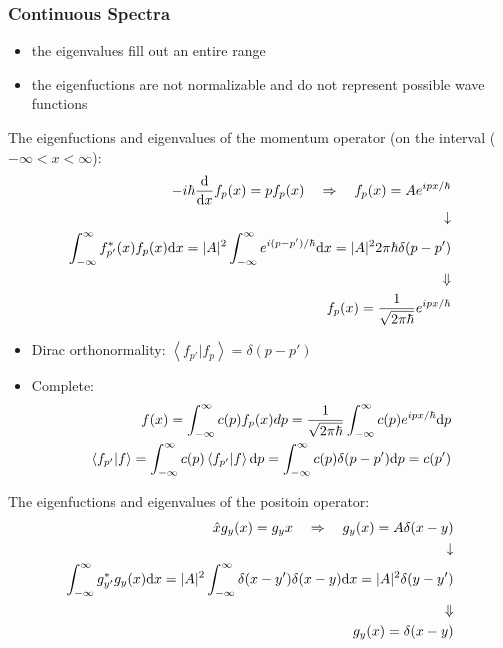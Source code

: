 \documentclass[a4paper,12pt]{article}
\begin{document}
\subsubsection{Continuous Spectra}
\begin{itemize}
       \item the eigenvalues fill out an entire range
       \item the eigenfuctions are not normalizable and do not represent possible wave functions
\end{itemize}
The eigenfuctions and eigenvalues of the momentum operator (on the interval (\(-\infty < x < \infty\)):
\[ \begin{split}
       -i\hbar \dv{x}f_p(x) = pf_p(x) \quad\Rightarrow\quad 
   f_p(x) = Ae^{ipx/\hbar} \\ \downarrow \\
   \int_{-\infty}^{\infty}f_{p'}^*(x)f_p(x){\rm d}x = |A|^2 \int_{-\infty}^{\infty}e^{i(p-p')/\hbar}{\rm d}x=
   |A|^22\pi\hbar\delta(p-p') \\ \Downarrow \\
   f_p(x)=\frac{1}{\sqrt{2\pi\hbar}}e^{ipx/\hbar}
\end{split}
\]
\begin{itemize}
       \item Dirac orthonormality: \(\left\langle f_{p'}|f_p\right\rangle =\delta(p-p')\)
       \item Complete:\[\begin{split}
              f(x) = \int_{-\infty}^{\infty} c(p)f_p(x)dp =\frac{1}{\sqrt{2\pi\hbar}}\int_{-\infty}^\infty c(p)e^{ipx/\hbar}{\rm d}p\\
              \left\langle f_{p'}|f\right\rangle =\int_{-\infty}^{\infty}c(p)\left\langle f_{p'}|f\right\rangle {\rm d}p =
              \int_{-\infty}^{\infty}c(p)\delta(p-p'){\rm d}p=c(p')
       \end{split}\]
\end{itemize}
The eigenfuctions and eigenvalues of the positoin operator: 
\[\begin{split}
       \hat{x} g_y(x)= g_y{x}  \quad\Rightarrow \quad
       g_y(x) = A\delta(x-y) \\ \downarrow \\
       \int_{-\infty}^{\infty}g_{y'}^*g_y(x){\rm d}x = |A|^2 \int_{-\infty}^{\infty}\delta(x-y')\delta(x-y){\rm d}x =
       |A|^2\delta(y-y')  \\ \Downarrow \\
       g_y(x) = \delta(x-y)
\end{split}
\]
\end{document}

